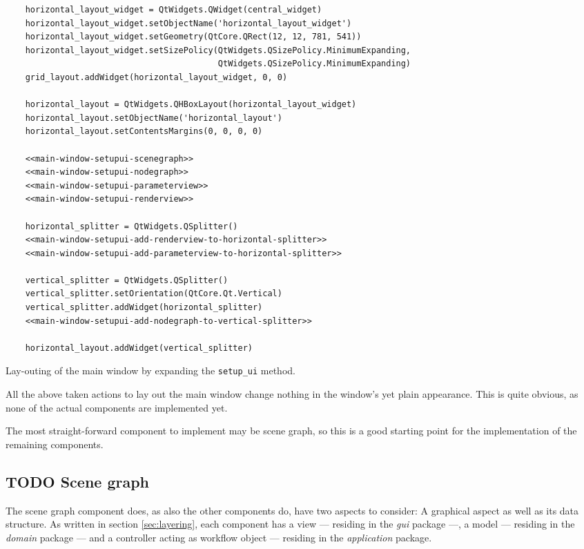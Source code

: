 \documentclass[10pt, openright, notitlepage]{scrreprt}
\begin{document}
\begin{listing}[H]
\begin{verbatim}
    horizontal_layout_widget = QtWidgets.QWidget(central_widget)
    horizontal_layout_widget.setObjectName('horizontal_layout_widget')
    horizontal_layout_widget.setGeometry(QtCore.QRect(12, 12, 781, 541))
    horizontal_layout_widget.setSizePolicy(QtWidgets.QSizePolicy.MinimumExpanding,
                                           QtWidgets.QSizePolicy.MinimumExpanding)
    grid_layout.addWidget(horizontal_layout_widget, 0, 0)

    horizontal_layout = QtWidgets.QHBoxLayout(horizontal_layout_widget)
    horizontal_layout.setObjectName('horizontal_layout')
    horizontal_layout.setContentsMargins(0, 0, 0, 0)

    <<main-window-setupui-scenegraph>>
    <<main-window-setupui-nodegraph>>
    <<main-window-setupui-parameterview>>
    <<main-window-setupui-renderview>>

    horizontal_splitter = QtWidgets.QSplitter()
    <<main-window-setupui-add-renderview-to-horizontal-splitter>>
    <<main-window-setupui-add-parameterview-to-horizontal-splitter>>

    vertical_splitter = QtWidgets.QSplitter()
    vertical_splitter.setOrientation(QtCore.Qt.Vertical)
    vertical_splitter.addWidget(horizontal_splitter)
    <<main-window-setupui-add-nodegraph-to-vertical-splitter>>

    horizontal_layout.addWidget(vertical_splitter)
\end{verbatim}
\caption{\label{main-window-setupui}
Lay-outing of the main window by expanding the \texttt{setup\_ui} method.}
\end{listing}

All the above taken actions to lay out the main window change nothing in the
window's yet plain appearance. This is quite obvious, as none of the actual
components are implemented yet.

The most straight-forward component to implement may be scene graph, so this is
a good starting point for the implementation of the remaining components.

\subsection{{\bfseries\sffamily TODO} Scene graph}
\label{sec:orgad9bda9}

The scene graph component does, as also the other components do, have two
aspects to consider: A graphical aspect as well as its data structure. As
written in section \ref{sec:layering}, each component has a view --- residing in the \emph{gui}
package ---, a model --- residing in the \emph{domain} package --- and a controller
acting as workflow object --- residing in the \emph{application} package.
\end{document}
